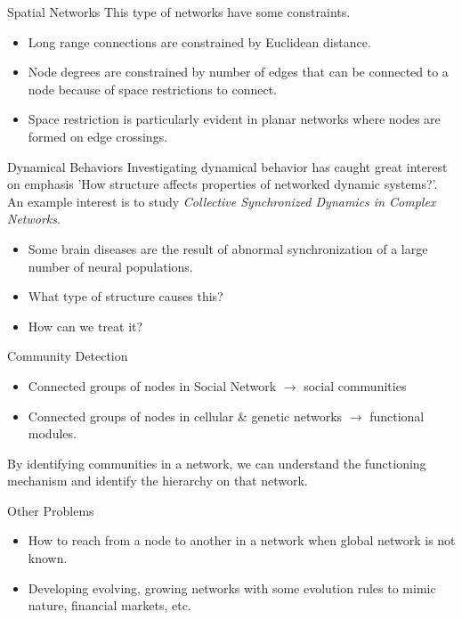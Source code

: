\documentclass{beamer}
\begin{document}

\begin{frame}{Spatial Networks}
This type of networks have some constraints.
\begin{itemize}
 \item Long range connections are constrained by Euclidean distance.
 \item Node degrees are constrained by number of edges that can be connected to a node because of space restrictions to connect. 
 \item Space restriction is particularly evident in planar networks where nodes are formed on edge crossings.
\end{itemize}
\end{frame}


\begin{frame}{Dynamical Behaviors}
Investigating dynamical behavior has caught great interest on emphasis 'How structure affects properties of networked dynamic systems?'. An example interest is to study \textit{Collective Synchronized Dynamics in Complex Networks}.
\begin{itemize}
 \item Some brain diseases are the result of abnormal synchronization of a large number of neural populations.
 \item What type of structure causes this?
 \item How can we treat it?
\end{itemize}
\end{frame}


\begin{frame}{Community Detection}
\begin{itemize}
 \item Connected groups of nodes in Social Network $\rightarrow$ social communities
 \item Connected groups of nodes in cellular \& genetic networks $\rightarrow$ functional modules.
\end{itemize}
By identifying communities in a network, we can understand the functioning mechanism and identify the hierarchy on that network.

\end{frame}


\begin{frame}{Other Problems}
\begin{itemize}
 \item How to reach from a node to another in a network when global network is not known.
 \item Developing evolving, growing networks with some evolution rules to mimic nature, financial markets, etc.
\end{itemize}
\end{frame}
\end{document}
